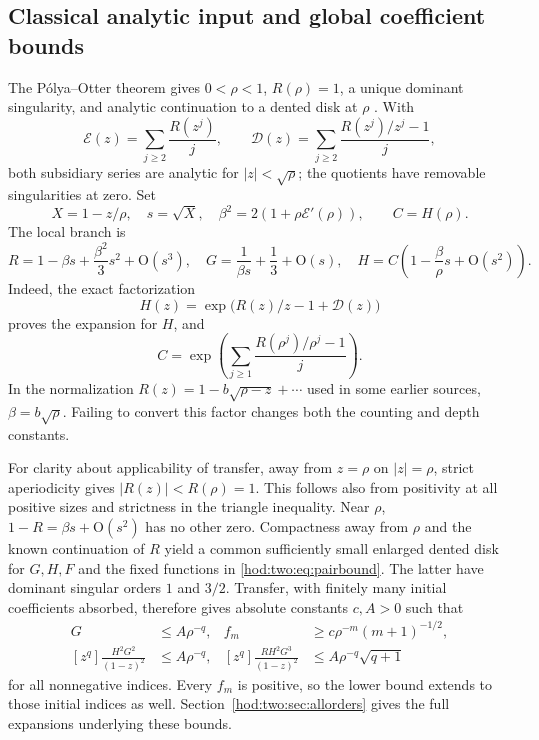 \documentclass[11pt,letterpaper]{article}
\theoremstyle{definition}\newtheorem{definition}[theorem]{Definition}
\theoremstyle{remark}\newtheorem{remark}[theorem]{Remark}
\newcommand{\Dcal}{\mathcal D}
\newcommand{\Ecal}{\mathcal E}
\newcommand{\bigO}{\mathrm O}
\begin{document}
\subsection{Classical analytic input and global coefficient bounds}
The P\'olya--Otter theorem gives $0<\rho<1$, $R(\rho)=1$, a unique dominant singularity, and analytic continuation to a dented disk at $\rho$ \cite{otter,fs}. With
\begin{equation}\label{hod:two:eq:tails}
\Ecal(z)=\sum_{j\ge2}\frac{R(z^j)}j,
\qquad
\Dcal(z)=\sum_{j\ge2}\frac{R(z^j)/z^j-1}{j},
\end{equation}
both subsidiary series are analytic for $|z|<\sqrt\rho$; the quotients have removable singularities at zero. Set
\begin{equation}\label{hod:two:eq:beta}
X=1-z/\rho,\quad s=\sqrt X,\quad
\beta^2=2(1+\rho\Ecal'(\rho)),\qquad
C=H(\rho).
\end{equation}
The local branch is
\begin{equation}\label{hod:two:eq:local}
R=1-\beta s+\frac{\beta^2}{3}s^2+\bigO(s^3),\quad
G=\frac1{\beta s}+\frac13+\bigO(s),\quad
H=C\left(1-\frac\beta\rho s+\bigO(s^2)\right).
\end{equation}
Indeed, the exact factorization
\begin{equation}\label{hod:two:eq:Hfactor}
H(z)=\exp\bigl(R(z)/z-1+\Dcal(z)\bigr)
\end{equation}
proves the expansion for $H$, and
\begin{equation}\label{hod:two:eq:C}
C=\exp\!\left(\sum_{j\ge1}\frac{R(\rho^j)/\rho^j-1}{j}\right).
\end{equation}
In the normalization $R(z)=1-b\sqrt{\rho-z}+\cdots$ used in some earlier sources, $\beta=b\sqrt\rho$. Failing to convert this factor changes both the counting and depth constants.

For clarity about applicability of transfer, away from $z=\rho$ on $|z|=\rho$, strict aperiodicity gives $|R(z)|<R(\rho)=1$. This follows also from positivity at all positive sizes and strictness in the triangle inequality. Near $\rho$, $1-R=\beta s+\bigO(s^2)$ has no other zero. Compactness away from $\rho$ and the known continuation of $R$ yield a common sufficiently small enlarged dented disk for $G,H,F$ and the fixed functions in \eqref{hod:two:eq:pairbound}. The latter have dominant singular orders $1$ and $3/2$. Transfer, with finitely many initial coefficients absorbed, therefore gives absolute constants $c,A>0$ such that
\begin{align}
[z^q]G&\le A\rho^{-q},& f_m&\ge c\rho^{-m}(m+1)^{-1/2},\label{hod:two:eq:basicbounds}\\
[z^q]\frac{H^2G^2}{(1-z)^2}&\le A\rho^{-q},&
[z^q]\frac{RH^2G^3}{(1-z)^2}&\le A\rho^{-q}\sqrt{q+1}
\label{hod:two:eq:bounds}
\end{align}
for all nonnegative indices. Every $f_m$ is positive, so the lower bound extends to those initial indices as well. Section~\ref{hod:two:sec:allorders} gives the full expansions underlying these bounds.
\end{document}
